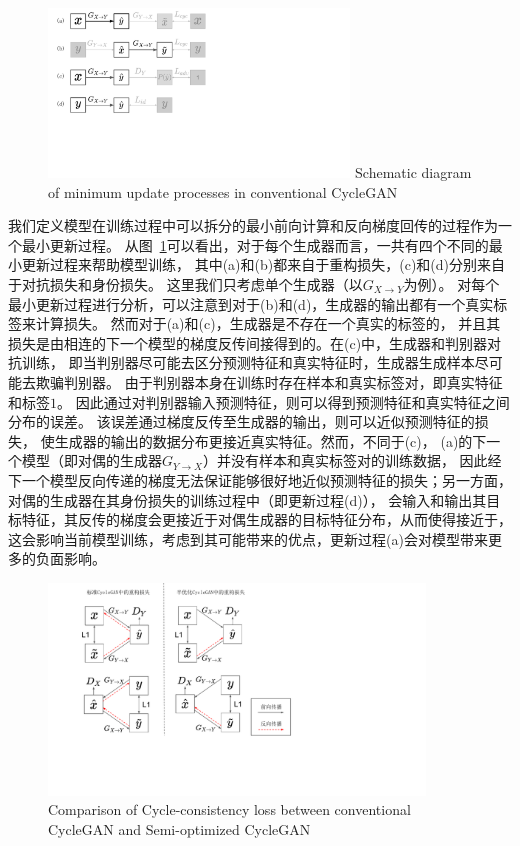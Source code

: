 \begin{figure}[!htp]
    \centering
    \includegraphics[width=8cm,trim=0 150 300 0,clip]{figure/4_dataflow.pdf}
    {Schematic diagram of minimum update processes in conventional CycleGAN}
    \label{fig:dataflow}
\end{figure}

我们定义模型在训练过程中可以拆分的最小前向计算和反向梯度回传的过程作为一个最小更新过程。
从图~\ref{fig:dataflow}可以看出，对于每个生成器而言，一共有四个不同的最小更新过程来帮助模型训练，
其中(a)和(b)都来自于重构损失，(c)和(d)分别来自于对抗损失和身份损失。
这里我们只考虑单个生成器（以$G_{X\rightarrow Y}$为例）。
对每个最小更新过程进行分析，可以注意到对于(b)和(d)，生成器的输出都有一个真实标签来计算损失。
然而对于(a)和(c)，生成器是不存在一个真实的标签的，
并且其损失是由相连的下一个模型的梯度反传间接得到的。在(c)中，生成器和判别器对抗训练，
即当判别器尽可能去区分预测特征和真实特征时，生成器生成样本尽可能去欺骗判别器。
由于判别器本身在训练时存在样本和真实标签对，即真实特征和标签$1$。
因此通过对判别器输入预测特征，则可以得到预测特征和真实特征之间分布的误差。
该误差通过梯度反传至生成器的输出，则可以近似预测特征的损失，
使生成器的输出的数据分布更接近真实特征。然而，不同于(c)，
(a)的下一个模型（即对偶的生成器$G_{Y\rightarrow X}$）并没有样本和真实标签对的训练数据，
因此经下一个模型反向传递的梯度无法保证能够很好地近似预测特征的损失；另一方面，
对偶的生成器在其身份损失的训练过程中（即更新过程(d)），
会输入和输出其目标特征，其反传的梯度会更接近于对偶生成器的目标特征分布，从而使得接近于，
这会影响当前模型训练，考虑到其可能带来的优点，更新过程(a)会对模型带来更多的负面影响。

\begin{figure}[!htp]
    \centering
    \includegraphics[width=10cm,trim=0 110 250 0,clip]{figure/4_semi.pdf}
    {Comparison of Cycle-consistency loss between conventional CycleGAN and Semi-optimized CycleGAN}
    \label{fig:semi}
\end{figure}

